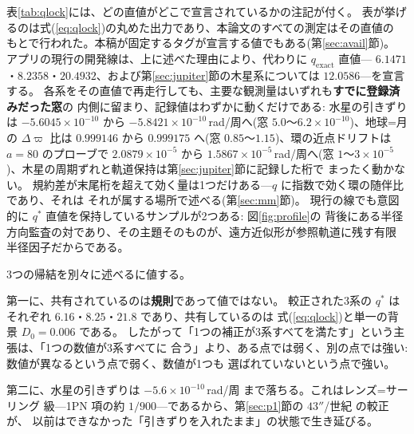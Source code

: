\documentclass[a4paper,10pt,twocolumn]{ltjsarticle}
\begin{document}
表\ref{tab:qlock}には、どの直値がどこで宣言されているかの注記が付く。
表が挙げるのは式(\ref{eq:qlock})の丸めた出力であり、本論文のすべての測定はその直値の
もとで行われた。本稿が固定するタグが宣言する値でもある(第\ref{sec:avail}節)。
アプリの現行の開発線は、上に述べた理由により、代わりに $q_{\mathrm{exact}}$ 直値---
$6.1471$・$8.2358$・$20.4932$、および第\ref{sec:jupiter}節の木星系については
$12.0586$---を宣言する。
各系をその直値で再走行しても、主要な観測量はいずれも\textbf{すでに登録済みだった窓}の
内側に留まり、記録値はわずかに動くだけである: 水星の引きずりは
$-5.6045\times10^{-10}$ から $-5.8421\times10^{-10}$\,rad/周へ(窓
$5.0$〜$6.2\times10^{-10}$)、地球=月の $\Delta\varpi$ 比は $0.999146$ から
$0.999175$ へ(窓 $0.85$〜$1.15$)、環の近点ドリフトは $a=80$ のプローブで
$2.0879\times10^{-5}$ から $1.5867\times10^{-5}$\,rad/周へ(窓
$1$〜$3\times10^{-5}$)、木星の周期ずれと軌道保持は第\ref{sec:jupiter}節に記録した桁で
まったく動かない。
規約差が末尾桁を超えて効く量は1つだけある---$q$ に指数で効く環の随伴比であり、それは
それが属する場所で述べる(第\ref{sec:mm}節)。
現行の線でも意図的に $q^{*}$ 直値を保持しているサンプルが2つある: 図\ref{fig:profile}の
背後にある半径方向監査の対であり、その主題そのものが、遠方近似形が参照軌道に残す有限
半径因子だからである。

3つの帰結を別々に述べるに値する。

第一に、共有されているのは\textbf{規則}であって値ではない。
較正された3系の $q^{*}$ はそれぞれ $6.16$・$8.25$・$21.8$ であり、共有しているのは
式(\ref{eq:qlock})と単一の背景 $D_0=0.006$ である。
したがって「1つの補正が3系すべてを満たす」という主張は、「1つの数値が3系すべてに
合う」より、ある点では弱く、別の点では強い: 数値が異なるという点で弱く、数値が1つも
選ばれていないという点で強い。

第二に、水星の引きずりは $-5.6\times10^{-10}$\,rad/周 まで落ちる。これはレンズ=サーリング
級---1PN 項の約 $1/900$---であるから、第\ref{sec:p1}節の $43''$/世紀 の較正が、
以前はできなかった「引きずりを入れたまま」の状態で生き延びる。
\end{document}
